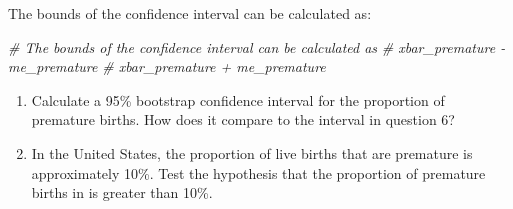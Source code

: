 \documentclass[
]{article}
\newenvironment{Shaded}{\begin{snugshade}}{\end{snugshade}}
\newcommand{\CommentTok}[1]{\textcolor[rgb]{0.56,0.35,0.01}{\textit{#1}}}
\begin{document}
The bounds of the confidence interval can be calculated as:

\begin{Shaded}
\begin{Highlighting}[]
\CommentTok{\# The bounds of the confidence interval can be calculated as}
\CommentTok{\# xbar\_premature {-} me\_premature}
\CommentTok{\# xbar\_premature + me\_premature}
\end{Highlighting}
\end{Shaded}

\begin{enumerate}
\def\labelenumi{\arabic{enumi}.}
\setcounter{enumi}{6}
\item
  Calculate a 95\% bootstrap confidence interval for the proportion of
  premature births. How does it compare to the interval in question 6?
\item
  In the United States, the proportion of live births that are premature
  is approximately 10\%. Test the hypothesis that the proportion of
  premature births in is greater than 10\%.
\end{enumerate}
\end{document}
